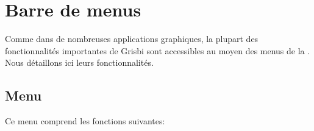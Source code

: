 
\section{Barre de menus\label{home-menus}}


Comme dans de nombreuses applications graphiques, la plupart des fonctionnalités importantes de Grisbi sont accessibles au moyen des menus de la . Nous détaillons ici leurs fonctionnalités.


\subsection{Menu \label{home-menus-file}}

Ce menu comprend les fonctions suivantes:

